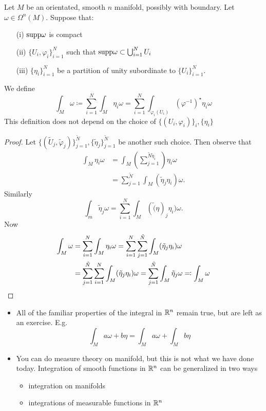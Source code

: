 \begin{lemma}\label{lem:11.8}
    Let \(M\) be an orientated, smooth \(n\) manifold, possibly with boundary. Let 
    \(\omega\in \Omega^n(M)\). Suppose that: 
    \begin{enumerate}
        \item[(i)] \(\text{supp}\omega\) is compact
        \item[(ii)] \(\{U_i,\varphi_i\}_{i=1}^N\) such that \(\text{supp}\omega\subset \bigcup_{i=1}^N U_i\)  
        \item[(iii)] \(\{\eta_i\}_{i=1}^N\) be a partition of unity subordinate to \(\{U_i\}_{i=1}^N\). 
    \end{enumerate}
    We define 
    \[\int_M \omega\coloneqq \sum_{i=1}^N \int_{M}\eta_i\omega=\sum_{i=1}^N \int_{\varphi_i(U_i)}(\varphi^{-1})^\star\eta_i\omega\]
    This definition does not depend on the choice of \(\{(U_i,\varphi_i)\}_i,\{\eta_i\}\)
\end{lemma}
\begin{proof}
    Let \(\{(\tilde{U}_j,\tilde{\varphi}_j)\}_{j=1}^{\tilde{N}},\{\tilde{\eta}_j\}_{j=1}^{\tilde{N}}\) be another such choice.
    Then observe that 
    \begin{align*}
        \int_M \eta_i \omega &= \int_M \left(\sum_{j=1}^{\tilde{N}\tilde{\eta}_i}\right)\eta_i\omega\\
        &=\sum_{j=1}^{\tilde{N}}\int_{M}(\tilde{\eta}_j\eta_i)\omega.
    \end{align*}
    Similarly \[\int_m \tilde{\eta}_j\omega=\sum_{i=1}^N\int_M(\tilde(\eta)_j\eta_i)\omega.\]
    Now 
    \begin{align*}
        \int_M\omega&=\sum_{i=1}^N\int_M \eta_i \omega =\sum_{i=1}^N\sum_{j=1}^{\tilde{N}}\int_M(\tilde{\eta}_j\eta_i)\omega\\
        &=\sum_{j=1}^{\tilde{N}}\sum_{i=1}^N\int_M(\tilde{\eta}_j\eta_i)\omega=\sum_{j=1}^{\tilde{N}}\int_M \tilde{\eta}_j \omega \eqqcolon \int_M \omega \qedhere
    \end{align*}
\end{proof}

\begin{remark}
    \begin{itemize}
        \item All of the familiar properties of the integral in \(\mathbb{R}^n\) remain true, but are left as an exercise. E.g.
                \[\int_M a\omega +b\eta=\int_M a\omega +\int_M b\eta\]
        \item You can do measure theory on manifold, but this is not what we have done today. Integration of smooth functions in \(\mathbb{R}^n\) can be generalized in two ways \begin{itemize}
            \item integration on manifolds 
            \item integrations of measurable functions in \(\mathbb{R}^n\)
        \end{itemize}
    \end{itemize}
\end{remark}

